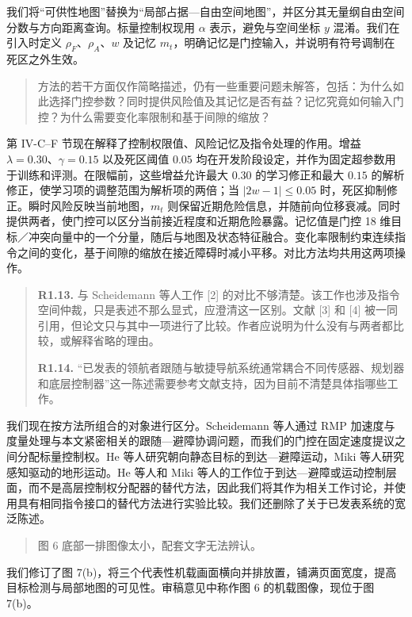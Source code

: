 我们将“可供性地图”替换为“局部占据—自由空间地图”，并区分其无量纲自由空间分数与方向距离查询。标量控制权现用 $\alpha$ 表示，避免与空间坐标 $y$ 混淆。我们在引入时定义 $\rho_F$、$\rho_A$、$w$ 及记忆 $m_t$，明确记忆是门控输入，并说明有符号调制在死区之外生效。

\begin{quote}
方法的若干方面仅作简略描述，仍有一些重要问题未解答，包括：为什么如此选择门控参数？同时提供风险值及其记忆是否有益？记忆究竟如何输入门控？为什么需要变化率限制和基于间隙的缩放？
\end{quote}
\response
第 IV-C--F 节现在解释了控制权限值、风险记忆及指令处理的作用。增益 $\lambda=0.30$、$\gamma=0.15$ 以及死区阈值 $0.05$ 均在开发阶段设定，并作为固定超参数用于训练和评测。在限幅前，这些增益允许最大 $0.30$ 的学习修正和最大 $0.15$ 的解析修正，使学习项的调整范围为解析项的两倍；当 $|2w-1|\leq0.05$ 时，死区抑制修正。瞬时风险反映当前地图，$m_t$ 则保留近期危险信息，并随前向位移衰减。同时提供两者，使门控可以区分当前接近程度和近期危险暴露。记忆值是门控 18 维目标／冲突向量中的一个分量，随后与地图及状态特征融合。变化率限制约束连续指令之间的变化，基于间隙的缩放在接近障碍时减小平移。对比方法均共用这两项操作。

\begin{quote}
\textbf{R1.13.} 与 Scheidemann 等人工作 [2] 的对比不够清楚。该工作也涉及指令空间仲裁，只是表述不那么显式，应澄清这一区别。文献 [3] 和 [4] 被一同引用，但论文只与其中一项进行了比较。作者应说明为什么没有与两者都比较，或解释省略的理由。

\textbf{R1.14.} “已发表的领航者跟随与敏捷导航系统通常耦合不同传感器、规划器和底层控制器”这一陈述需要参考文献支持，因为目前不清楚具体指哪些工作。
\end{quote}
\response
我们现在按方法所组合的对象进行区分。Scheidemann 等人通过 RMP 加速度与度量处理与本文紧密相关的跟随—避障协调问题，而我们的门控在固定速度提议之间分配标量控制权。He 等人研究朝向静态目标的到达—避障运动，Miki 等人研究感知驱动的地形运动。He 等人和 Miki 等人的工作位于到达—避障或运动控制层面，而不是高层控制权分配器的替代方法，因此我们将其作为相关工作讨论，并使用具有相同指令接口的替代方法进行实验比较。我们还删除了关于已发表系统的宽泛陈述。

\begin{quote}
图 6 底部一排图像太小，配套文字无法辨认。
\end{quote}
\response
我们修订了图 7(b)，将三个代表性机载画面横向并排放置，铺满页面宽度，提高目标检测与局部地图的可见性。审稿意见中称作图 6 的机载图像，现位于图 7(b)。

